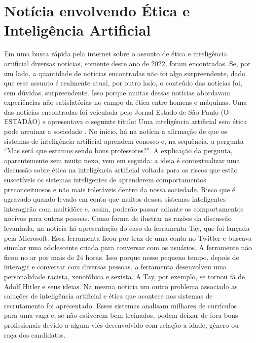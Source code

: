 \documentclass{article}
\begin{document}
%
\section*{Notícia envolvendo Ética e Inteligência Artificial}
Em uma busca rápida pela internet sobre o assunto de ética e inteligência artificial diversas notícias, somente deste ano de 2022, foram encontradas. Se, por um lado, a quantidade de notícias encontradas não foi algo surpreendente, dado que esse assunto é realmente atual, por outro lado, o conteúdo das notícias foi, sem dúvidas, surpreendente. Isso porque muitas dessas notícias abordavam experiências não satisfatórias no campo da ética entre homens e máquinas. Uma das notícias encontradas foi veiculada pelo Jornal Estado de São Paulo (O ESTADÃO) e apresentava o seguinte título: Uma inteligência artificial sem ética pode arruinar a sociedade \cite{Estadao_online}. No início, há na notícia a afirmação de que os sistemas de inteligência artificial aprendem conosco e, na sequência, a pergunta ``Mas será que estamos sendo bons professores?". A explicação da pergunta, aparentemente sem muito nexo, vem em seguida: a ideia é contextualizar uma discussão sobre ética na inteligência artificial voltada para os riscos que estão suscetíveis os sistemas inteligentes de aprenderem comportamentos preconceituosos e não mais toleráveis dentro da nossa sociedade. Risco que é agravado quando levado em conta que muitos dessas sistemas inteligentes interagirão com multidões e, assim, poderão passar adiante os comportamentos nocivos para outras pessoas. Como forma de ilustrar as razões da discussão levantada, na notícia há apresentação do caso da ferramenta Tay, que foi lançada pela Microsoft. Essa ferramenta ficou por traz de uma conta no Twitter e buscava simular uma adolescente criada para conversar com os usuários. A ferramente não ficou no ar por mais de 24 horas. Isso porque nesse pequeno tempo, depois de interagir e conversar com diversas pessoas, a ferramenta desenvolveu uma personalidade racista, xenofóbica e sexista. A Tay, por exemplo, se tornou fã de Adolf Hitler e seus ideias. Na mesma notícia um outro problema associado as soluções de inteligência artificial e ética que acontece nos sistemas de recrutamento foi apresentado. Esses sistemas analisam milhares de currículos para uma vaga e, se não estiverem bem treinados, podem deixar de fora bons profissionais devido a algum viés desenvolvido com relação a idade, gênero ou raça dos candidatos.

%
\end{document}
